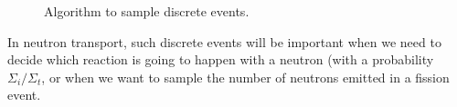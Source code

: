 \begin{figure}[ht!]
\protect {}\protect
\caption{\label{fig:discrete} \footnotesize{Algorithm to sample discrete events.}}
\end{figure}


In neutron transport, such discrete events will be important when we need to decide which reaction is going to happen with a neutron (with a probability $\Sigma_i/\Sigma_t$, or when we want to sample the number of neutrons emitted in a fission event. 

